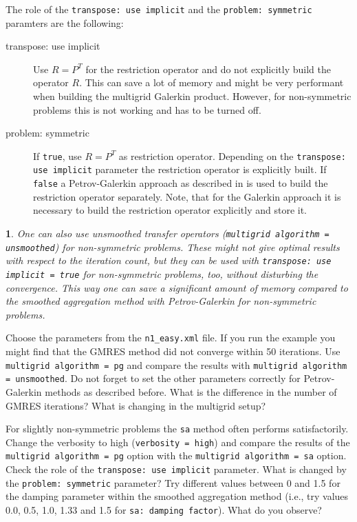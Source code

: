 \documentclass[10pt,fleqn]{book}
\newtheorem*{mycomment}{\ding{42}}
\begin{document}
The role of the \texttt{transpose: use implicit} and the \texttt{problem: symmetric} paramters are the following:
\begin{description}
\item[transpose: use implicit] Use $R=P^T$ for the restriction operator and do not explicitly build the operator $R$. This can save a lot of memory and might be very performant when building the multigrid Galerkin product. However, for non-symmetric problems this is not working and has to be turned off.
\item[problem: symmetric] If \texttt{true}, use $R=P^T$ as restriction operator. Depending on the \texttt{transpose: use implicit} parameter the restriction operator is explicitly built. If \texttt{false} a Petrov-Galerkin approach as described in \cite{sala2008} is used to build the restriction operator separately. Note, that for the Galerkin approach it is necessary to build the restriction operator explicitly and store it.
\end{description}

\begin{mycomment}
One can also use unsmoothed transfer operators (\texttt{multigrid algorithm = unsmoothed}) for non-symmetric problems. These might not give optimal results with respect to the iteration count, but they can be used with \texttt{transpose: use implicit = true} for non-symmetric problems, too, without disturbing the convergence. This way one can save a significant amount of memory compared to the smoothed aggregation method with Petrov-Galerkin for non-symmetric problems.
\end{mycomment}

\begin{exercise} Choose the parameters from the \texttt{n1\_easy.xml} file. If you run the example you might find that the GMRES method did not converge within 50 iterations. Use \texttt{multigrid algorithm = pg} and compare the results with \texttt{multigrid algorithm = unsmoothed}. Do not forget to set the other parameters correctly for Petrov-Galerkin methods as described before. What is the difference in the number of GMRES iterations? What is changing in the multigrid setup?
\end{exercise}
\begin{exercise}
For slightly non-symmetric problems the \texttt{sa} method often performs satisfactorily. Change the verbosity to high (\texttt{verbosity = high}) and compare the results of the \texttt{multigrid algorithm = pg} option with the \texttt{multigrid algorithm = sa} option. Check the role of the \texttt{transpose: use implicit} parameter. What is changed by the \texttt{problem: symmetric} parameter? Try different values between 0 and 1.5 for the damping parameter within the smoothed aggregation method (i.e., try values 0.0, 0.5, 1.0, 1.33 and 1.5 for \texttt{sa: damping factor}). What do you observe?
\end{exercise}
\end{document}
